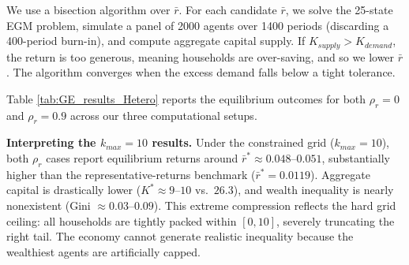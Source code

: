 \documentclass[11pt, a4paper]{article}
\begin{document}
We use a bisection algorithm over $\bar{r}$. For each candidate $\bar{r}$, we solve the 25-state EGM problem, simulate a panel of 2000 agents over 1400 periods (discarding a 400-period burn-in), and compute aggregate capital supply. If $K_{supply} > K_{demand}$, the return is too generous, meaning households are over-saving, and so we lower $\bar{r}$. The algorithm converges when the excess demand falls below a tight tolerance.

Table \ref{tab:GE_results_Hetero} reports the equilibrium outcomes for both $\rho_r = 0$ and $\rho_r = 0.9$ across our three computational setups.

\begin{table}[H]
\centering
\caption{Comprehensive General Equilibrium Comparison (Representative vs. Heterogeneous Returns)}
\label{tab:GE_results_Hetero}
\end{table}

\textbf{Interpreting the $k_{max}=10$ results.} Under the constrained grid ($k_{max}=10$), both $\rho_r$ cases report equilibrium returns around $\bar{r}^* \approx 0.048$--$0.051$, substantially higher than the representative-returns benchmark ($\bar{r}^* = 0.0119$). Aggregate capital is drastically lower ($K^* \approx 9$--$10$ vs.\ $26.3$), and wealth inequality is nearly nonexistent (Gini $\approx 0.03$--$0.09$). This extreme compression reflects the hard grid ceiling: all households are tightly packed within $[0, 10]$, severely truncating the right tail. The economy cannot generate realistic inequality because the wealthiest agents are artificially capped.
\end{document}
